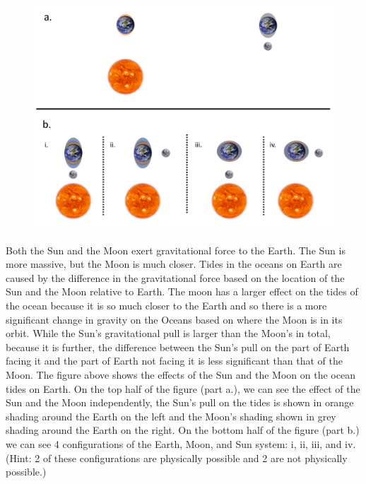 \documentclass[12pt]{article}%
\begin{document}
\begin{figure}[htb!]
\center
\includegraphics[width=15cm]{tides_fig.pdf}
\end{figure}


Both the Sun and the Moon exert gravitational force to the Earth. 
The Sun is more massive, but the Moon is much closer. Tides in the oceans on Earth are caused by the difference in the gravitational force based on the location of the Sun and the Moon relative to Earth. The moon has a larger effect on the tides of the ocean because it is so much closer to the Earth and so there is a more significant change in gravity on the Oceans based on where the Moon is in its orbit. While the Sun's gravitational pull is larger than the Moon's in total, because it is further, the difference between the Sun's pull on the part of Earth facing it and the part of Earth not facing it is less significant than that of the Moon. The figure above shows the effects of the Sun and the Moon on the ocean tides on Earth. On the top half of the figure (part a.), we can see the effect of the Sun and the Moon independently, the Sun's pull on the tides is shown in orange shading around the Earth on the left and the Moon's shading shown in grey shading around the Earth on the right. On the bottom half of the figure (part b.) we can see 4 configurations of the Earth, Moon, and Sun system: i, ii, iii, and iv. (Hint: 2 of these configurations are physically possible and 2 are not physically possible.)
\end{document}
